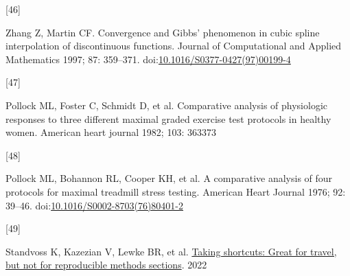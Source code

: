 \documentclass[
  letterpaper,
  DIV=11,
  numbers=noendperiod]{scrartcl}
\newlength{\cslhangindent}
\newlength{\csllabelwidth}
\newenvironment{CSLReferences}[2] %
 {\begin{list}{}{%
  \setlength{\itemindent}{0pt}
  \setlength{\leftmargin}{0pt}
  \setlength{\parsep}{0pt}
  \ifodd #1
   \setlength{\leftmargin}{\cslhangindent}
   \setlength{\itemindent}{-1\cslhangindent}
  \fi
  \setlength{\itemsep}{#2\baselineskip}}}
 {\end{list}}
\newcommand{\CSLLeftMargin}[1]{\parbox[t]{\csllabelwidth}{\strut#1\strut}}
\newcommand{\CSLRightInline}[1]{\parbox[t]{\linewidth - \csllabelwidth}{\strut#1\strut}}
\begin{document}
\begin{CSLReferences}{0}{1}
\CSLLeftMargin{{[}46{]} }%
\CSLRightInline{Zhang Z, Martin CF. Convergence and Gibbs' phenomenon in
cubic spline interpolation of discontinuous functions. Journal of
Computational and Applied Mathematics 1997; 87: 359--371.
doi:\href{https://doi.org/10.1016/S0377-0427(97)00199-4}{10.1016/S0377-0427(97)00199-4}}

\CSLLeftMargin{{[}47{]} }%
\CSLRightInline{Pollock ML, Foster C, Schmidt D, et al. Comparative
analysis of physiologic responses to three different maximal graded
exercise test protocols in healthy women. American heart journal 1982;
103: 363373}

\CSLLeftMargin{{[}48{]} }%
\CSLRightInline{Pollock ML, Bohannon RL, Cooper KH, et al. A comparative
analysis of four protocols for maximal treadmill stress testing.
American Heart Journal 1976; 92: 39--46.
doi:\href{https://doi.org/10.1016/S0002-8703(76)80401-2}{10.1016/S0002-8703(76)80401-2}}

\CSLLeftMargin{{[}49{]} }%
\CSLRightInline{Standvoss K, Kazezian V, Lewke BR, et al.
\href{https://doi.org/10.1101/2022.08.08.503174}{Taking shortcuts: Great
for travel, but not for reproducible methods sections}. 2022}

\end{CSLReferences}
\end{document}
